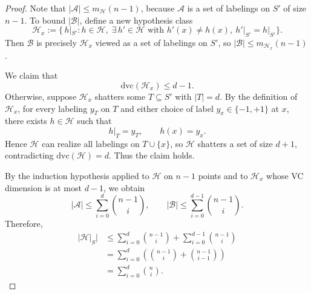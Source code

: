 \documentclass[../main]{subfiles}
\begin{document}
\begin{proof}
    Note that $|\mathcal{A}| \le m_{\mathcal{H}}(n-1)$, because $\mathcal{A}$
    is a set of labelings on $S'$ of size $n-1$.
    To bound $|\mathcal{B}|$, define a new hypothesis class
    \begin{equation}
        \mathcal{H}_x
        := \bigl\{\, h|_{S'} : h\in\mathcal{H},\;
            \exists\,h' \in \mathcal{H}
            \text{ with } h'(x)\neq h(x),\ h'|_{S'}=h|_{S'} \bigr\}.
    \end{equation}
    Then $\mathcal{B}$ is precisely $\mathcal{H}_x$ viewed as a set of labelings on $S'$,
    so $|\mathcal{B}| \le m_{\mathcal{H}_x}(n-1)$.
    
    We claim that
    \begin{equation}
        \mathrm{dvc}(\mathcal{H}_x) \le d-1.
    \end{equation}
    Otherwise, suppose $\mathcal{H}_x$ shatters some $T \subseteq S'$ with $|T|=d$.
    By the definition of $\mathcal{H}_x$, for every labeling $y_T$ on $T$
    and either choice of label $y_x \in \{-1,+1\}$ at $x$, there exists $h\in\mathcal{H}$
    such that
    \begin{equation}
        h|_{T} = y_T, \qquad h(x) = y_x.
    \end{equation}
    Hence $\mathcal{H}$ can realize all labelings on $T \cup \{x\}$,
    so $\mathcal{H}$ shatters a set of size $d+1$, contradicting
    $\mathrm{dvc}(\mathcal{H}) = d$.
    Thus the claim holds.
    
    By the induction hypothesis applied to $\mathcal{H}$ on $n-1$ points
    and to $\mathcal{H}_x$ whose VC dimension is at most $d-1$, we obtain
    \begin{equation}
        |\mathcal{A}| \le \sum_{i=0}^{d} \binom{n-1}{i},
        \qquad
        |\mathcal{B}| \le \sum_{i=0}^{d-1} \binom{n-1}{i}.
    \end{equation}
    Therefore,
    \begin{align}
        |\mathcal{H}|_S|
        &\le \sum_{i=0}^{d} \binom{n-1}{i}
           + \sum_{i=0}^{d-1} \binom{n-1}{i} \\
        &= \sum_{i=0}^{d} \left( \binom{n-1}{i} + \binom{n-1}{i-1} \right) \\
        &= \sum_{i=0}^{d} \binom{n}{i}.
    \end{align}
    \end{proof}
\end{document}
